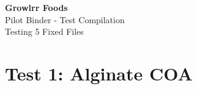 \documentclass[11pt,oneside]{book}
\begin{document}
\begin{titlepage}
\centering
\vspace*{2cm}
{\Huge\bfseries Growlrr Foods}\\[0.5cm]
{\Large Pilot Binder - Test Compilation}\\[0.3cm]
{\large Testing 5 Fixed Files}\\[2cm]
\end{titlepage}

\frontmatter
\tableofcontents
\clearpage

\mainmatter

\chapter{Test 1: Alginate COA}


% 

% 

% 

% 
\end{document}
